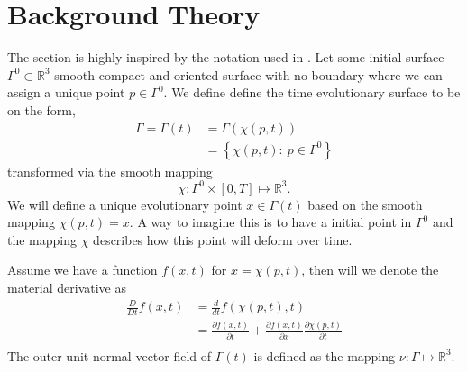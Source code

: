 

\section{Background Theory}%
\label{sec:differential_geometry}

The section is highly inspired by the notation used in \cite{kovacs2021convergent}.
Let some initial surface $\Gamma^{0} \subset \mathbb{R} ^3  $ smooth compact and oriented surface with no boundary where we can assign a unique point $p \in \Gamma ^{0}$. We define define the time evolutionary surface to be on the form,
\[
    \begin{split}
\Gamma  = \Gamma \left( t \right) & = \Gamma \left( \chi \left( p,t \right)  \right) \\
                                  &= \left\{ \chi \left( p,t \right): \ p \in \Gamma^{0}  \right\}
    \end{split}
\]
transformed via the smooth mapping
\[
\chi : \Gamma^{0} \times  \left[ 0,T \right]  \mapsto  \mathbb{R} ^3.
\]
We will define a unique evolutionary point $x \in \Gamma \left( t \right) $ based on the smooth mapping $\chi \left( p,t \right) = x$. A way to imagine this is to have a initial point in $\Gamma ^{0}$ and the mapping $\chi $ describes how this point will deform over time.

Assume we have a function $f\left( x,t \right) $ for $x = \chi \left( p,t \right)  $, then will we denote the material derivative as
\[
    \begin{split}
\frac{D}{Dt}  f\left( x,t \right)  & = \frac{d}{dt} f \left( \chi \left( p,t \right) , t \right) \\
&= \frac{\partial f\left( x,t \right) }{\partial  t} + \frac{\partial f\left( x,t \right) }{\partial  x}  \frac{\partial \chi \left( p,t \right) }{\partial  t}   \\
    \end{split}
\]
The outer unit normal vector field of $\Gamma \left( t \right) $ is defined as the mapping $\nu : \Gamma \mapsto
\mathbb{R} ^{3}$.



